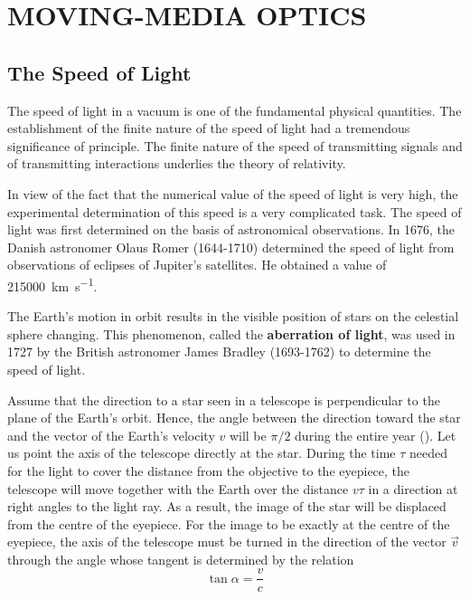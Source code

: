 
\chapter[MOVING-MEDIA OPTICS]{MOVING-MEDIA OPTICS}\label{chap:21}

\section{The Speed of Light}\label{sec:21_1}

The speed of light in a vacuum is one of the fundamental physical quantities.
The establishment of the finite nature of the speed of light had a tremendous significance of principle.
The finite nature of the speed of transmitting signals and of transmitting interactions underlies the theory of relativity.

In view of the fact that the numerical value of the speed of light is very high, the experimental determination of this speed is a very complicated task.
The speed of light was first determined on the basis of astronomical observations.
In 1676, the Danish astronomer Olaus Romer (1644-1710) determined the speed of light from observations of eclipses of Jupiter's satellites.
He obtained a value of \SI{215000}{km.s^{-1}}.

The Earth's motion in orbit results in the visible position of stars on the celestial sphere changing.
This phenomenon, called the \textbf{aberration of light}, was used in 1727 by the British astronomer James Bradley (1693-1762) to determine the speed of light.

Assume that the direction to a star seen in a telescope is perpendicular to the plane of the Earth's orbit.
Hence, the angle between the direction toward the star and the vector of the Earth's velocity $v$ will be $\pi/2$ during the entire year ().
Let us point the axis of the telescope directly at the star.
During the time $\tau$ needed for the light to cover the distance from the objective to the eyepiece, the telescope will move together with the Earth over the distance $v\tau$ in a direction at right angles to the light ray.
As a result, the image of the star will be displaced from the centre of the eyepiece.
For the image to be exactly at the centre of the eyepiece, the axis of the telescope must be turned in the direction of the vector $\vec{v}$ through the angle whose tangent is determined by the relation
\begin{equation}\label{eq:21_1}
    \tan\alpha = \frac{v}{c}
\end{equation}

